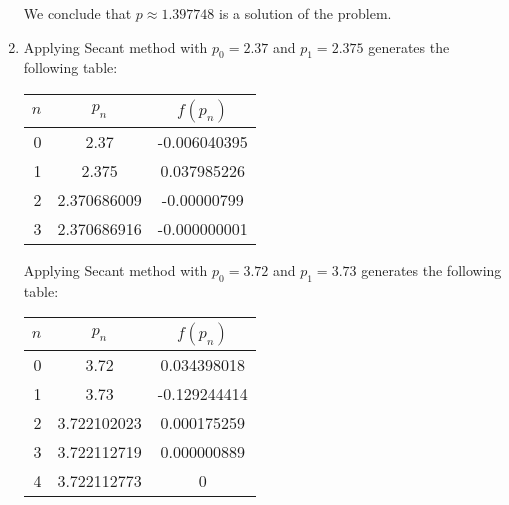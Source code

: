 \documentclass[../../../../Assignments]{subfiles}
\begin{document}
\begin{solution}
\begin{enumerate}[label = \alph*)]
            We conclude that \(p \approx \num{1.397748}\) is a solution of the
            problem.

        \item Applying Secant method with \(p_0 = \num{2.37}\) and \(p_1 =
            \num{2.375}\) generates the following table:

            \begin{table}[H]
                \centering
                \begin{tabular}{r S[table-format=1.9] S[table-format=-1.9]}
                    \toprule
                    \(n\)  &   {\(p_n\)}   &  {\(f(p_n)\)}  \\
                      &  2.37         &  -0.006040395  \\
                        1  &  2.375        &   0.037985226  \\
                        2  &  2.370686009  &  -0.00000799   \\
                        3  &  2.370686916  &  -0.000000001  \\
                    \bottomrule
                \end{tabular}
            \end{table}

            Applying Secant method with \(p_0 = \num{3.72}\) and \(p_1 =
            \num{3.73}\) generates the following table:

            \begin{table}[H]
                \centering
                \begin{tabular}{r S[table-format=1.9] S[table-format=-1.9]}
                    \toprule
                    \(n\)  &   {\(p_n\)}   &  {\(f(p_n)\)}  \\
                      &  3.72         &   0.034398018  \\
                        1  &  3.73         &  -0.129244414  \\
                        2  &  3.722102023  &   0.000175259  \\
                        3  &  3.722112719  &   0.000000889  \\
                        4  &  3.722112773  &   0            \\
                    \bottomrule
                \end{tabular}
            \end{table}


\end{enumerate}
\end{solution}
\end{document}
